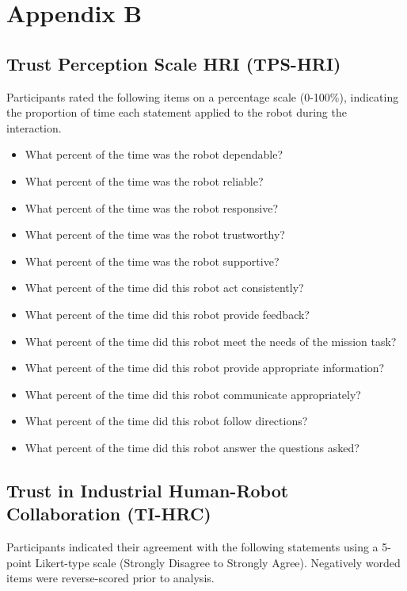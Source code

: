 \documentclass[
  authoryear,
  doubleblind,
  3p]{elsarticle}
\providecommand{\tightlist}{%
  \setlength{\itemsep}{0pt}\setlength{\parskip}{0pt}}
\begin{document}
\section{Appendix B}\label{sec-appendix-b}

\subsection{Trust Perception Scale HRI
(TPS-HRI)}\label{trust-perception-scale-hri-tps-hri}

Participants rated the following items on a percentage scale (0-100\%),
indicating the proportion of time each statement applied to the robot
during the interaction.

\begin{itemize}
\tightlist
\item
  What percent of the time was the robot dependable?
\item
  What percent of the time was the robot reliable?
\item
  What percent of the time was the robot responsive?
\item
  What percent of the time was the robot trustworthy?
\item
  What percent of the time was the robot supportive?
\item
  What percent of the time did this robot act consistently?
\item
  What percent of the time did this robot provide feedback?
\item
  What percent of the time did this robot meet the needs of the mission
  task?
\item
  What percent of the time did this robot provide appropriate
  information?
\item
  What percent of the time did this robot communicate appropriately?
\item
  What percent of the time did this robot follow directions?
\item
  What percent of the time did this robot answer the questions asked?
\end{itemize}

\subsection{Trust in Industrial Human-Robot Collaboration
(TI-HRC)}\label{trust-in-industrial-human-robot-collaboration-ti-hrc}

Participants indicated their agreement with the following statements
using a 5-point Likert-type scale (Strongly Disagree to Strongly Agree).
Negatively worded items were reverse-scored prior to analysis.
\end{document}

